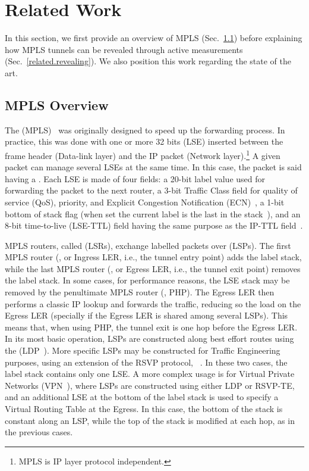 \section{Related Work}\label{related}
In this section, we first provide an overview of MPLS
(Sec.~\ref{related.overview}) before explaining how MPLS tunnels can be revealed
through active measurements (Sec.~\ref{related.revealing}).  We also position
this work regarding the state of the art.

\subsection{MPLS Overview}\label{related.overview}
The  (MPLS)~\cite{rfc3031} was originally
designed to speed up the forwarding process. In practice, this was done with one
or more 32 bits  (LSE) inserted between the frame
header (Data-link layer) and the IP packet (Network layer).\footnote{MPLS is IP
layer protocol independent.} A given packet can manage several LSEs at the same
time. In this case, the packet is said having a .  Each LSE
is made of four fields:  a 20-bit label value used for forwarding the packet to
the next router, a 3-bit Traffic Class field for quality of service (QoS),
priority, and Explicit Congestion Notification (ECN)~\cite{rfc5462}, a 1-bit
bottom of stack flag (when set the current label is the last in the
stack~\cite{rfc3032}), and an 8-bit time-to-live (LSE-TTL) field having the same
purpose as the IP-TTL field~\cite{rfc3443}.

MPLS routers, called  (LSRs), exchange labelled
packets over  (LSPs).   The first MPLS router
(, or Ingress LER, i.e., the tunnel entry point)
adds the label stack, while the last MPLS router (, or Egress LER, i.e., the tunnel exit point) removes the label stack.
In some cases, for performance reasons, the LSE stack may be removed by the
penultimate MPLS router (, PHP).  The Egress LER
then performs a classic IP lookup and forwards the traffic, reducing so the load
on the Egress LER (specially if the Egress LER is shared among several LSPs).
This means that, when using PHP, the tunnel exit is one hop before the Egress
LER.  In its most basic operation, LSPs are constructed along best effort routes
using the  (LDP~\cite{rfc5036}). More specific
LSPs may be constructed for Traffic Engineering purposes, using an extension of
the RSVP protocol, ~\cite{rfc3209}. In these two cases, the label
stack contains only one LSE. A more complex usage is for Virtual Private Networks
(VPN~\cite{rfc2917}), where LSPs are constructed using either LDP or RSVP-TE,
and an additional LSE at the bottom of the label stack is used to specify a Virtual
Routing Table at the Egress. In this case, the bottom of the stack is constant
along an LSP, while the top of the stack is modified at each hop, as in the
previous cases.

